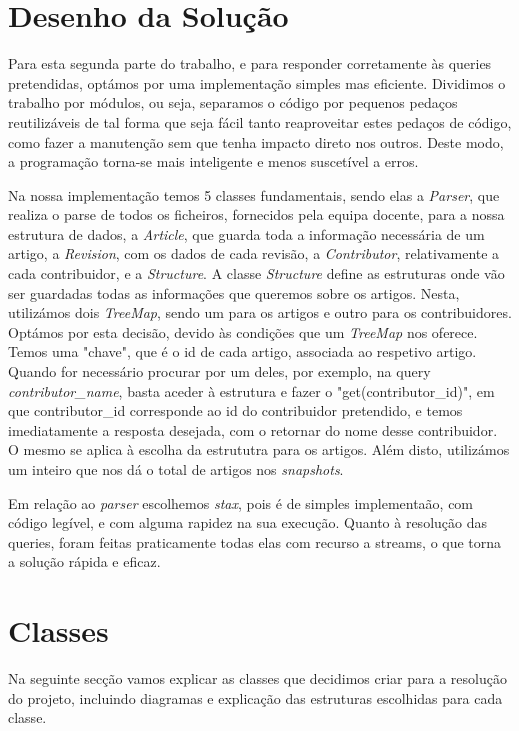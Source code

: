 \documentclass{article}
\begin{document}
\clearpage

\section{Desenho da Solução}
\par Para esta segunda parte do trabalho, e para responder corretamente às queries pretendidas, optámos por uma implementação simples mas eficiente. Dividimos o trabalho por módulos, ou seja, separamos o código por pequenos pedaços reutilizáveis de tal forma que seja fácil tanto reaproveitar estes pedaços de código, como fazer a manutenção sem que tenha impacto direto nos outros. Deste modo, a programação torna-se mais inteligente e menos suscetível a erros.
\par Na nossa implementação temos 5 classes fundamentais, sendo elas a \emph{Parser}, que realiza o parse de todos os ficheiros, fornecidos pela equipa docente, para a nossa estrutura de dados, a \emph{Article}, que guarda toda a informação necessária de um artigo, a \emph{Revision}, com os dados de cada revisão, a \emph{Contributor}, relativamente a cada contribuidor, e a \emph{Structure}. A classe \emph{Structure} define as estruturas onde vão ser guardadas todas as informações que queremos sobre os artigos. Nesta, utilizámos dois \emph{TreeMap}, sendo um para os artigos e outro para os contribuidores. Optámos por esta decisão, devido às condições que um \emph{TreeMap} nos oferece. Temos uma "chave", que é o id de cada artigo, associada ao respetivo artigo. Quando for necessário procurar por um deles, por exemplo, na query \emph{contributor\_name}, basta aceder à estrutura e fazer o "get(contributor\_id)", em que contributor\_id corresponde ao id do contribuidor pretendido, e temos imediatamente a resposta desejada, com o retornar do nome desse contribuidor. O mesmo se aplica à escolha da estrututra para os artigos. Além disto, utilizámos um inteiro que nos dá o total de artigos nos \emph{snapshots}.
\par Em relação ao \emph{parser} escolhemos \emph{stax}, pois é de simples implementaão, com código legível, e com alguma rapidez na sua execução. Quanto à resolução das queries, foram feitas praticamente todas elas com recurso a streams, o que torna a solução rápida e eficaz.

\clearpage

\section{Classes}
Na seguinte secção vamos explicar as classes que decidimos criar para a resolução do projeto, incluindo diagramas e explicação das estruturas escolhidas para cada classe.
\end{document}
